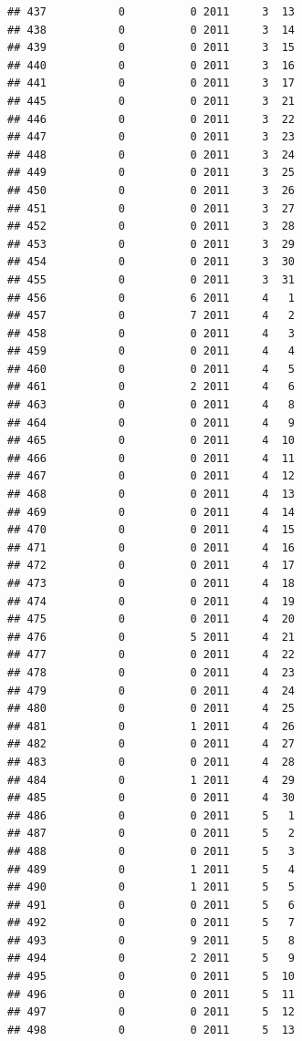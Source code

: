 \documentclass[
]{article}
\begin{document}
\begin{verbatim}
## 437           0          0 2011     3  13
## 438           0          0 2011     3  14
## 439           0          0 2011     3  15
## 440           0          0 2011     3  16
## 441           0          0 2011     3  17
## 445           0          0 2011     3  21
## 446           0          0 2011     3  22
## 447           0          0 2011     3  23
## 448           0          0 2011     3  24
## 449           0          0 2011     3  25
## 450           0          0 2011     3  26
## 451           0          0 2011     3  27
## 452           0          0 2011     3  28
## 453           0          0 2011     3  29
## 454           0          0 2011     3  30
## 455           0          0 2011     3  31
## 456           0          6 2011     4   1
## 457           0          7 2011     4   2
## 458           0          0 2011     4   3
## 459           0          0 2011     4   4
## 460           0          0 2011     4   5
## 461           0          2 2011     4   6
## 463           0          0 2011     4   8
## 464           0          0 2011     4   9
## 465           0          0 2011     4  10
## 466           0          0 2011     4  11
## 467           0          0 2011     4  12
## 468           0          0 2011     4  13
## 469           0          0 2011     4  14
## 470           0          0 2011     4  15
## 471           0          0 2011     4  16
## 472           0          0 2011     4  17
## 473           0          0 2011     4  18
## 474           0          0 2011     4  19
## 475           0          0 2011     4  20
## 476           0          5 2011     4  21
## 477           0          0 2011     4  22
## 478           0          0 2011     4  23
## 479           0          0 2011     4  24
## 480           0          0 2011     4  25
## 481           0          1 2011     4  26
## 482           0          0 2011     4  27
## 483           0          0 2011     4  28
## 484           0          1 2011     4  29
## 485           0          0 2011     4  30
## 486           0          0 2011     5   1
## 487           0          0 2011     5   2
## 488           0          0 2011     5   3
## 489           0          1 2011     5   4
## 490           0          1 2011     5   5
## 491           0          0 2011     5   6
## 492           0          0 2011     5   7
## 493           0          9 2011     5   8
## 494           0          2 2011     5   9
## 495           0          0 2011     5  10
## 496           0          0 2011     5  11
## 497           0          0 2011     5  12
## 498           0          0 2011     5  13

\end{verbatim}
\end{document}
